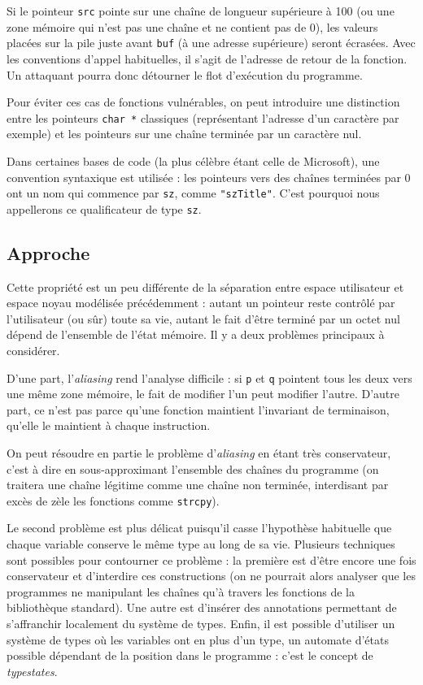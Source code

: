 
Si le pointeur \texttt{src} pointe sur une chaîne de longueur supérieure à 100
(ou une zone mémoire qui n'est pas une chaîne et ne contient pas de 0), les
valeurs placées sur la pile juste avant \texttt{buf} (à une adresse supérieure)
seront écrasées. Avec les conventions d'appel habituelles, il s'agit de
l'adresse de retour de la fonction. Un attaquant pourra donc détourner le flot
d'exécution du programme.

Pour éviter ces cas de fonctions vulnérables, on peut introduire une distinction
entre les pointeurs \texttt{char *} classiques (représentant l'adresse d'un
caractère par exemple) et les pointeurs sur une chaîne terminée par un caractère
nul.

Dans certaines bases de code (la plus célèbre étant celle de Microsoft), une
convention syntaxique est utilisée : les pointeurs vers des chaînes terminées
par 0 ont un nom qui commence par \texttt{sz}, comme \texttt{"szTitle"}. C'est
pourquoi nous appellerons ce qualificateur de type \texttt{sz}.

\subsection{Approche}

Cette propriété est un peu différente de la séparation entre espace utilisateur
et espace noyau modélisée précédemment : autant un pointeur reste contrôlé par
l'utilisateur (ou sûr) toute sa vie, autant le fait d'être terminé par un octet
nul dépend de l'ensemble de l'état mémoire. Il y a deux problèmes principaux à
considérer.

D'une part, l'\emph{aliasing} rend l'analyse difficile : si \texttt{p} et
\texttt{q} pointent tous les deux vers une même zone mémoire, le fait de
modifier l'un peut modifier l'autre. D'autre part, ce n'est pas parce qu'une
fonction maintient l'invariant de terminaison, qu'elle le maintient à chaque
instruction.

On peut résoudre en partie le problème d'\emph{aliasing} en étant très
conservateur, c'est à dire en sous-approximant l'ensemble des chaînes du
programme (on traitera une chaîne légitime comme une chaîne non terminée,
interdisant par excès de zèle les fonctions comme \texttt{strcpy}).

Le second problème est plus délicat puisqu'il casse l'hypothèse habituelle que
chaque variable conserve le même type au long de sa vie. Plusieurs techniques
sont possibles pour contourner ce problème : la première est d'être encore une
fois conservateur et d'interdire ces constructions (on ne pourrait alors
analyser que les programmes ne manipulant les chaînes qu'à travers les fonctions
de la bibliothèque standard). Une autre est d'insérer des annotations permettant
de s'affranchir localement du système de types. Enfin, il est possible
d'utiliser un système de types où les variables ont en plus d'un type, un
automate d'états possible dépendant de la position dans le programme : c'est le
concept de \emph{typestates}\cite{tse12-typestate}.


